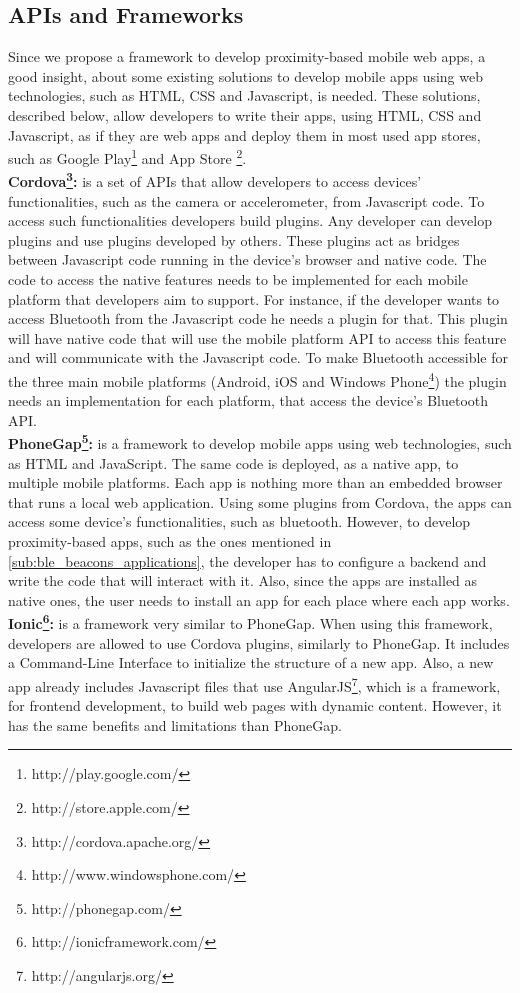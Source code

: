 \subsection{APIs and Frameworks}
\label{sub:frameworks_web}
Since we propose a framework to develop proximity-based
mobile web apps, a good insight, about some existing
solutions to develop mobile apps using web technologies,
such as
HTML, CSS and Javascript,
is needed.
These solutions, described below, allow developers to
write their apps, using HTML, CSS and Javascript, as
if they are web apps and deploy them in most used app
stores, such as
Google Play\footnote{http://play.google.com/}
and
App Store \footnote{http://store.apple.com/}.
\\
\textbf{Cordova\footnote{http://cordova.apache.org/}:}
is a set of APIs that allow developers to access
devices' functionalities, such as the camera or
accelerometer, from Javascript code.
To access such functionalities developers build plugins.
Any developer can develop plugins and use plugins
developed by others. These plugins act as bridges
between Javascript code running in the device's
browser and native code.
The code to access the native features
needs to be implemented for each mobile platform
that developers aim to support.
For instance, if
the developer wants to access Bluetooth from
the Javascript code he needs a plugin for that.
This plugin will have native code that will
use the mobile platform API to access this
feature and will communicate with the Javascript
code. To make Bluetooth accessible
for the three main mobile platforms
(Android, iOS and
Windows Phone\footnote{http://www.windowsphone.com/})
the plugin
needs an implementation for each platform, that
access the device's Bluetooth API.
\\
\textbf{PhoneGap\footnote{http://phonegap.com/}:}
is a framework to develop mobile apps
using web technologies, such as HTML and JavaScript. The
same code is deployed, as a native app, to multiple mobile
platforms. Each app is nothing more than an embedded browser
that runs a local web application.
Using some plugins from Cordova, the apps can access some
device's functionalities, such as bluetooth.
However, to develop proximity-based apps, such as
the ones mentioned in
\ref{sub:ble_beacons_applications},
the developer has to configure a backend and write the
code that will interact with it. Also, since the apps are
installed as native ones, the user needs to install
an app for each place where each app works.
\\
\textbf{Ionic\footnote{http://ionicframework.com/}:}
is a framework very similar to PhoneGap. When using
this framework, developers are allowed to use Cordova
plugins, similarly to PhoneGap. It includes a
Command-Line Interface to initialize the structure
of a new app. Also, a new app already includes Javascript
files that use
AngularJS\footnote{http://angularjs.org/},
which is a framework, for frontend development,
to build web pages with dynamic content.
However, it has the same benefits and limitations
than PhoneGap.
